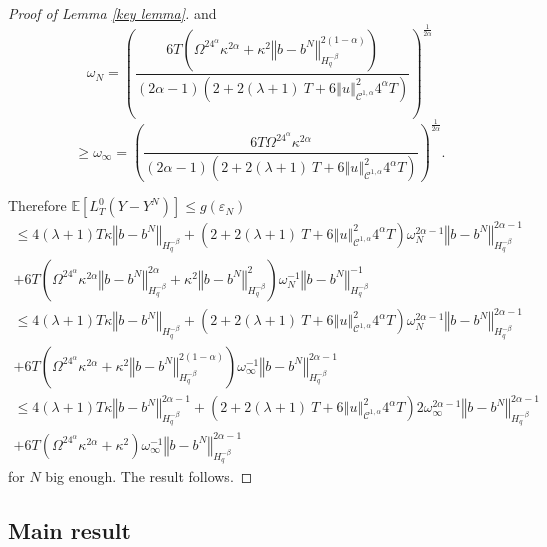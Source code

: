\documentclass[11pt]{article}
\newcommand{\norme}[1]{\left\Vert #1\right\Vert}
\newcommand{\E}{\mathbb{E}}
\begin{document}
\begin{proof}[Proof of Lemma \ref{key lemma}]
    and \begin{equation*}
    \omega_N = \left(\frac{6T\left(\Omega^24^{\alpha}\kappa^{2\alpha} +\kappa^2\norme{b-b^N}_{H^{-\beta}_{q}}^{2(1-\alpha)}\right)}{(2\alpha-1)\left(2 + 2(\lambda + 1)\ T + 6\norme{u}_{\mathcal{C}^{1,\alpha}}^2 4^{\alpha}T\right)}\right)^{\frac{1}{2\alpha}}
    \end{equation*}
    \begin{equation*}
    \geq\omega_\infty=\left(\frac{6T\Omega^24^{\alpha}\kappa^{2\alpha} }{(2\alpha-1)\left(2 + 2(\lambda + 1)\ T + 6\norme{u}_{\mathcal{C}^{1,\alpha}}^2 4^{\alpha}T\right)}\right)^{\frac{1}{2\alpha}}.
    \end{equation*}
    
    Therefore $
    \E\left[L^0_T(Y-Y^N)\right]\leq g(\varepsilon_N)
    $
    \begin{multline*}
    \leq 4(\lambda + 1)T\kappa\norme{b-b^N}_{H^{-\beta}_{q}} + \left(2 + 2(\lambda + 1)\ T + 6\norme{u}_{\mathcal{C}^{1,\alpha}}^2 4^{\alpha}T\right) \omega_N^{2\alpha-1}\norme{b-b^N}_{H^{-\beta}_{q}}^{2\alpha-1} \\ + 6T\left(\Omega^24^{\alpha}\kappa^{2\alpha} \norme{b-b^N}_{H^{-\beta}_q}^{2\alpha}+\kappa^2\norme{b-b^N}_{H^{-\beta}_{q}}^2\right)\omega_N^{-1}\norme{b-b^N}_{H^{-\beta}_{q}}^{-1}
    \end{multline*} 
    \begin{multline*}
    \leq 4(\lambda + 1)T\kappa\norme{b-b^N}_{H^{-\beta}_{q}} + \left(2 + 2(\lambda + 1)\ T + 6\norme{u}_{\mathcal{C}^{1,\alpha}}^2 4^{\alpha}T\right) \omega_N^{2\alpha-1}\norme{b-b^N}_{H^{-\beta}_{q}}^{2\alpha-1} \\ + 6T\left(\Omega^24^{\alpha}\kappa^{2\alpha} +\kappa^2\norme{b-b^N}_{H^{-\beta}_{q}}^{2(1-\alpha)}\right)\omega_\infty^{-1}\norme{b-b^N}_{H^{-\beta}_{q}}^{2\alpha-1}
    \end{multline*}   
    \begin{multline*}
    \leq 4(\lambda + 1)T\kappa\norme{b-b^N}_{H^{-\beta}_{q}}^{2\alpha-1} + \left(2 + 2(\lambda + 1)\ T + 6\norme{u}_{\mathcal{C}^{1,\alpha}}^2 4^{\alpha}T\right)2 \omega_\infty^{2\alpha-1}\norme{b-b^N}_{H^{-\beta}_{q}}^{2\alpha-1} \\ + 6T\left(\Omega^24^{\alpha}\kappa^{2\alpha} +\kappa^2\right)\omega_\infty^{-1}\norme{b-b^N}_{H^{-\beta}_{q}}^{2\alpha-1}
    \end{multline*}
    for $N$ big enough. The result follows.
\end{proof}

\subsection{Main result}
\end{document}
